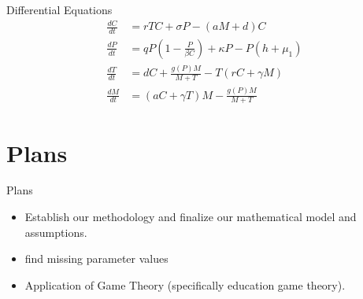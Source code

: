 \documentclass{beamer}
\begin{document}
\begin{frame}{Differential Equations}
    \begin{align*}
        \frac{dC}{dt} &= rTC + \sigma P- (aM+d)C\\
        \frac{dP}{dt} &= qP \left( 1-\frac{P}{\beta C} \right) + \kappa P - P \left( h+\mu_{1} \right)\\
        \frac{dT}{dt} &= dC + \frac{g(P)M}{M+T} - T(rC+\gamma M)\\
        \frac{dM}{dt} &= (aC+ \gamma T)M - \frac{g(P)M}{M+T}
    \end{align*}
\end{frame}

\section{Plans}
\begin{frame}{Plans}
    \begin{itemize}
        \item Establish our methodology and finalize our mathematical model and assumptions.
        \item find missing parameter values
        \item Application of Game Theory (specifically education game theory).
    \end{itemize}
\end{frame}



\end{document}
